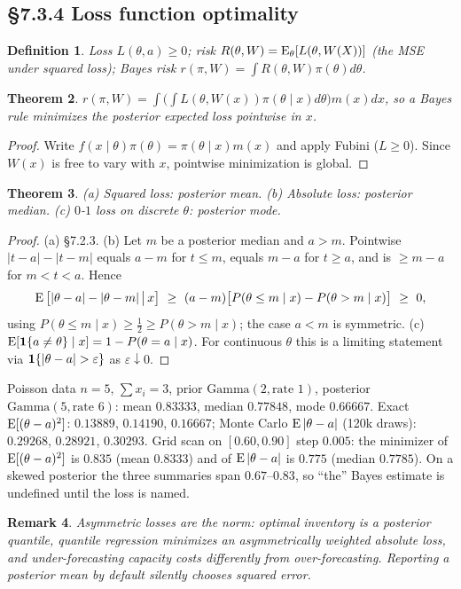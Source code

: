 \documentclass[11pt]{article}
\newtheorem{theorem}{Theorem}[section]
\newtheorem{definition}[theorem]{Definition}
\newtheorem{remark}[theorem]{Remark}
\begin{document}
\subsection{\S7.3.4 Loss function optimality}
\begin{definition}
Loss $L(\theta,a)\ge0$; risk $R(\theta,W)=\operatorname{E}_\theta[L(\theta,W(X))]$ (the MSE under squared loss); Bayes risk $r(\pi,W)=\int R(\theta,W)\pi(\theta)d\theta$.
\end{definition}
\begin{theorem}
$r(\pi,W)=\int\big(\int L(\theta,W(x))\pi(\theta\mid x)d\theta\big)m(x)dx$, so a Bayes rule minimizes the posterior expected loss pointwise in $x$.
\end{theorem}
\begin{proof}
Write $f(x\mid\theta)\pi(\theta)=\pi(\theta\mid x)m(x)$ and apply Fubini ($L\ge0$). Since $W(x)$ is free to vary with $x$, pointwise minimization is global.
\end{proof}
\begin{theorem}
(a) Squared loss: posterior mean. (b) Absolute loss: posterior median. (c) $0$-$1$ loss on discrete $\theta$: posterior mode.
\end{theorem}
\begin{proof}
(a) \S7.2.3. (b) Let $m$ be a posterior median and $a>m$. Pointwise $|t-a|-|t-m|$ equals $a-m$ for $t\le m$, equals $m-a$ for $t\ge a$, and is $\ge m-a$ for $m<t<a$. Hence
\[\E\big[|\theta-a|-|\theta-m|\,\big|\,x\big]\ \ge\ (a-m)\big[P(\theta\le m\mid x)-P(\theta>m\mid x)\big]\ \ge\ 0,\]
using $P(\theta\le m\mid x)\ge\frac12\ge P(\theta>m\mid x)$; the case $a<m$ is symmetric. (c) $\operatorname{E}[\mathbf 1\{a\ne\theta\}\mid x]=1-P(\theta=a\mid x)$. For continuous $\theta$ this is a limiting statement via $\ind\{|\theta-a|>\varepsilon\}$ as $\varepsilon\downarrow0$.
\end{proof}
\begin{simbox}
Poisson data $n=5$, $\sum x_i=3$, prior $\mathrm{Gamma}(2,\text{rate }1)$, posterior $\mathrm{Gamma}(5,\text{rate }6)$: mean $0.83333$, median $0.77848$, mode $0.66667$. Exact $\operatorname{E}[(\theta-a)^2]$: $0.13889$, $0.14190$, $0.16667$; Monte Carlo $\operatorname{E}|\theta-a|$ (120k draws): $0.29268$, $0.28921$, $0.30293$. Grid scan on $[0.60,0.90]$ step $0.005$: the minimizer of $\operatorname{E}[(\theta-a)^2]$ is $0.835$ (mean $0.8333$) and of $\operatorname{E}|\theta-a|$ is $0.775$ (median $0.7785$). On a skewed posterior the three summaries span $0.67$--$0.83$, so ``the'' Bayes estimate is undefined until the loss is named.
\end{simbox}
\begin{remark}
Asymmetric losses are the norm: optimal inventory is a posterior quantile, quantile regression minimizes an asymmetrically weighted absolute loss, and under-forecasting capacity costs differently from over-forecasting. Reporting a posterior mean by default silently chooses squared error.
\end{remark}
\end{document}
